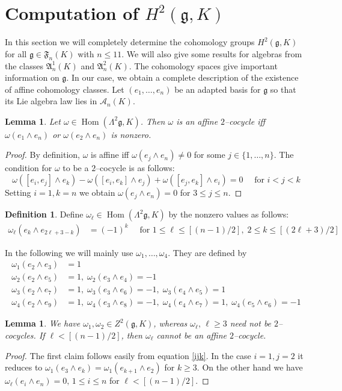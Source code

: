 \documentclass[12pt]{amsart}
\newtheorem{lem}[thm]{Lemma}
\theoremstyle{definition}
\newtheorem{defi}[thm]{Definition}
\theoremstyle{remark}
\DeclareMathOperator{\Hom}{Hom}
\newcommand{\Lg}{\mathfrak{g}}
\newcommand{\LA}{\mathfrak{A}}
\newcommand{\LF}{\mathfrak{F}}
\newcommand{\CA}{\mathcal{A}}
\newcommand{\om}{\omega}
\begin{document}
\section{Computation of $H^2(\Lg,K)$}

In this section we will completely determine the
cohomology groups $H^2(\Lg,K)$ for all $\Lg\in \LF_n(K)$ with $n\le 11$.
We will also give some results for algebras from the classes
$\LA_n^1(K)$ and $\LA_n^2(K)$.
The cohomology spaces give important information on $\Lg$. 
In our case, we obtain a complete description of the
existence of affine cohomology classes. 
Let $(e_1,\ldots ,e_n)$ be an adapted basis for $\Lg$
so that its Lie algebra law lies in $\CA_n(K)$.

\begin{lem}
Let $\om\in \Hom (\Lambda^2\Lg,K)$. Then $\om$ is an affine $2$--cocycle
iff $\om (e_1\wedge e_n)$ or $\om (e_2\wedge e_n)$ is nonzero.
\end{lem}
\begin{proof}
By definition, $\om$ is affine iff $\om (e_j\wedge e_n)\ne 0$ for some
$j\in \{1,\ldots ,n\}$. The condition for $\om$ to be a $2$--cocycle
is as follows:
\begin{equation}\label{ijk}
\om([e_i,e_j]\wedge e_k)-\om([e_i,e_k]\wedge e_j)+\om([e_j,e_k]\wedge
e_i)=0 \quad \text{ for } i<j<k
\end{equation}
Setting $i=1,k=n$ we obtain $\om(e_j \wedge e_n)=0$ for $3\le j\le n$.
\end{proof}

\begin{defi}
Define $\om_{\ell}\in \Hom (\Lambda^2\Lg,K)$ by the nonzero values as follows:
\begin{align}\label{omega}
\om_{\ell}(e_k\wedge e_{2\ell+3-k}) & = (-1)^k \quad \text{ for } 1\le \ell
\le [(n-1)/2],\; 2\le k\le \left[(2\ell+3)/2\right]
\end{align}
\end{defi}
In the following we will mainly use $\om_1,\dots,\om_4$.
They are defined by
\begin{align*}
\om_1(e_2\wedge e_3)& = 1 \\
\om_2(e_2\wedge e_5)& = 1,\;\om_2(e_3\wedge e_4) = -1\\
\om_3(e_2\wedge e_7)& = 1,\;\om_3(e_3\wedge e_6) = -1,\;
\om_3(e_4\wedge e_5) = 1\\
\om_4(e_2\wedge e_9)& = 1,\;\om_4(e_3\wedge e_8) = -1,\;
\om_4(e_4\wedge e_7) = 1,\;\om_4(e_5\wedge e_6) = -1
\end{align*}
\begin{lem}
We have $\om_1,\om_2\in Z^2(\Lg,K)$, whereas $\om_{\ell},\,\ell \ge 3$
need not be $2$--cocycles. If $\ell <[(n-1)/2]$, then $\om_{\ell}$
cannot be an affine $2$--cocycle.
\end{lem}
\begin{proof}
The first claim follows easily from equation \eqref{ijk}.
In the case $i=1,j=2$ it reduces to $\om_1(e_3\wedge e_k)=
\om_1(e_{k+1}\wedge e_2)$ for $k\ge 3$.
On the other hand we have $\om_{\ell}(e_i\wedge e_n)=0,\, 1\le i\le n$ for
$\ell <[(n-1)/2]$.
\end{proof}
\end{document}
